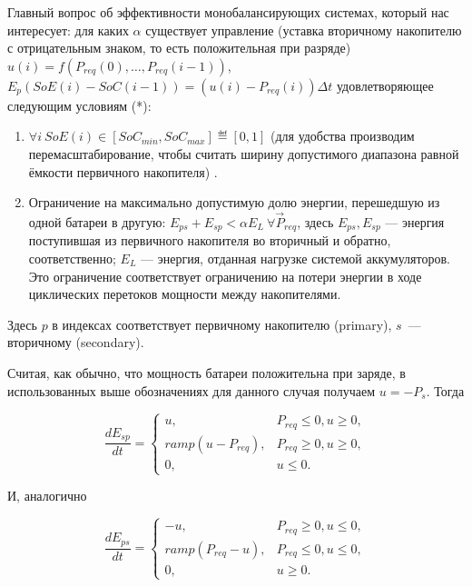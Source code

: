Главный вопрос об эффективности монобалансирующих системах, который нас интересует: для каких $\alpha$ существует управление (уставка вторичному накопителю с отрицательным знаком, то есть положительная при разряде) $u(i) = f(P_{req}(0), \ldots, P_{req}(i-1))$, $E_{p}(SoE(i) - SoC(i-1)) = \left( u(i) - P_{req}(i)\right)\Delta t$ удовлетворяющее следующим условиям (*):
\begin{enumerate}
    \item $\forall i ~ SoE(i) \in [SoC_{min}, SoC_{max}] \eqdef [0, 1]$ (для удобства производим перемасштабирование, чтобы считать ширину допустимого диапазона равной ёмкости первичного накопителя) .
    \item Ограничение на максимально допустимую долю энергии, перешедшую из одной батареи в другую: $E_{ps} + E_{sp} < \alpha E_{L}  ~\forall \Vec{P}_{req}$, здесь $E_{ps}, E_{sp}$ --- энергия поступившая из первичного накопителя во вторичный и обратно, соответственно; 
    $E_{L}$ ---  энергия, отданная нагрузке системой аккумуляторов.
    Это ограничение соответствует ограничению на потери энергии в ходе циклических перетоков мощности между накопителями.
\end{enumerate}

Здесь $p$ в индексах соответствует первичному накопителю (primary), $s$~--- вторичному (secondary).

Считая, как обычно, что мощность батареи положительна при заряде, в использованных выше обозначениях для данного случая получаем $u = -P_{s}$.
Тогда 

\begin{equation}
\label{f:Efc}
\frac{dE_{sp}}{dt} = 
\begin{cases}
u,& P_{req} \leq 0, u \geq 0,\\
ramp(u - P_{req}),& P_{req} \geq 0, u \geq 0,\\
0,& u \leq 0.
\end{cases}
\end{equation}

И, аналогично

\begin{equation}
\label{f:Ecf}
\frac{dE_{ps}}{dt} = 
\begin{cases}
-u,& P_{req} \geq 0, u \leq 0,\\
ramp(P_{req} - u),& P_{req} \leq0, u \leq 0,\\
0,& u \geq 0.
\end{cases}
\end{equation}

